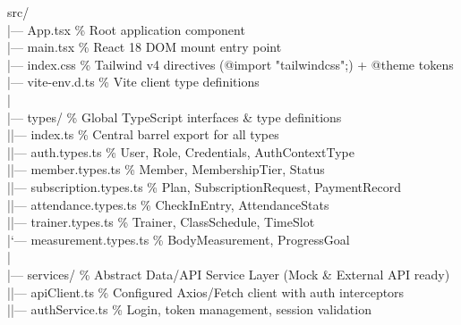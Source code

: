 \documentclass[11pt,a4paper]{article}
\newcommand{\codebox}[1]{%
\begin{tcolorbox}[
    enhanced,
    breakable,
    colback=codebg,
    colframe=primaryblue!30,
    boxrule=0.5pt,
    arc=1mm,
    left=10pt, right=10pt, top=8pt, bottom=8pt
]
{\ttfamily\footnotesize\color{codetext} #1}
\end{tcolorbox}
\vspace{4pt}
}
\begin{document}
\codebox{
src/\\
|--- App.tsx \hfill\textcolor{medgray}{\% Root application component}\\
|--- main.tsx \hfill\textcolor{medgray}{\% React 18 DOM mount entry point}\\
|--- index.css \hfill\textcolor{medgray}{\% Tailwind v4 directives (@import "tailwindcss";) + @theme tokens}\\
|--- vite-env.d.ts \hfill\textcolor{medgray}{\% Vite client type definitions}\\
|\\
|--- types/ \hfill\textcolor{medgray}{\% Global TypeScript interfaces \& type definitions}\\
|\hspace{1.5em}|--- index.ts \hfill\textcolor{medgray}{\% Central barrel export for all types}\\
|\hspace{1.5em}|--- auth.types.ts \hfill\textcolor{medgray}{\% User, Role, Credentials, AuthContextType}\\
|\hspace{1.5em}|--- member.types.ts \hfill\textcolor{medgray}{\% Member, MembershipTier, Status}\\
|\hspace{1.5em}|--- subscription.types.ts \hfill\textcolor{medgray}{\% Plan, SubscriptionRequest, PaymentRecord}\\
|\hspace{1.5em}|--- attendance.types.ts \hfill\textcolor{medgray}{\% CheckInEntry, AttendanceStats}\\
|\hspace{1.5em}|--- trainer.types.ts \hfill\textcolor{medgray}{\% Trainer, ClassSchedule, TimeSlot}\\
|\hspace{1.5em}`--- measurement.types.ts \hfill\textcolor{medgray}{\% BodyMeasurement, ProgressGoal}\\
|\\
|--- services/ \hfill\textcolor{medgray}{\% Abstract Data/API Service Layer (Mock \& External API ready)}\\
|\hspace{1.5em}|--- apiClient.ts \hfill\textcolor{medgray}{\% Configured Axios/Fetch client with auth interceptors}\\
|\hspace{1.5em}|--- authService.ts \hfill\textcolor{medgray}{\% Login, token management, session validation}\\
}
\end{document}
